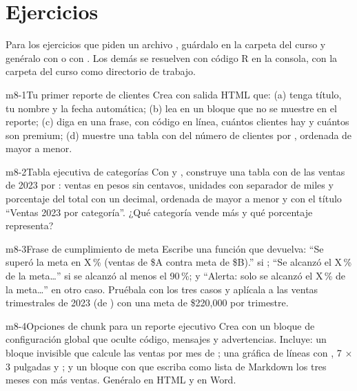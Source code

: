 \section{Ejercicios}
\label{sec:m8-ejercicios}

Para los ejercicios que piden un archivo , guárdalo en la
carpeta  del curso y genéralo con  o con
. Los demás se resuelven con código R en la
consola, con la carpeta del curso como directorio de trabajo.

\begin{ejercicio}{m8-1}{Tu primer reporte de clientes}
Crea  con salida HTML que:
(a) tenga título, tu nombre y la fecha automática;
(b) lea  en un bloque que no se muestre en el
reporte;
(c) diga en una frase, con código en línea, cuántos clientes hay y cuántos
son premium;
(d) muestre una tabla con  del número de clientes por
, ordenada de mayor a menor.
\end{ejercicio}

\begin{ejercicio}{m8-2}{Tabla ejecutiva de categorías}
Con  y , construye una
tabla con  de las ventas de 2023 por
: ventas en pesos sin centavos, unidades con separador de
miles y porcentaje del total con un decimal, ordenada de mayor a menor y con
el título ``Ventas 2023 por categoría''. ¿Qué categoría vende más y qué
porcentaje representa?
\end{ejercicio}

\begin{ejercicio}{m8-3}{Frase de cumplimiento de meta}
Escribe una función  que devuelva:
``Se superó la meta en X\,\% (ventas de \$A contra meta de \$B).'' si
; ``Se alcanzó el X\,\% de la meta\ldots'' si se
alcanzó al menos el 90\,\%; y ``Alerta: solo se alcanzó el X\,\% de la
meta\ldots'' en otro caso. Pruébala con los tres casos y aplícala a las
ventas trimestrales de 2023 (de ) con una meta de
\$220,000 por trimestre.
\end{ejercicio}

\begin{ejercicio}{m8-4}{Opciones de chunk para un reporte ejecutivo}
Crea  con un bloque de configuración
global que oculte código, mensajes y advertencias. Incluye: un bloque
invisible que calcule las ventas por mes de ;
una gráfica de líneas con , 7 $\times$ 3 pulgadas y
; y un bloque con  que
escriba como lista de Markdown los tres meses con más ventas. Genéralo en
HTML y en Word.
\end{ejercicio}

